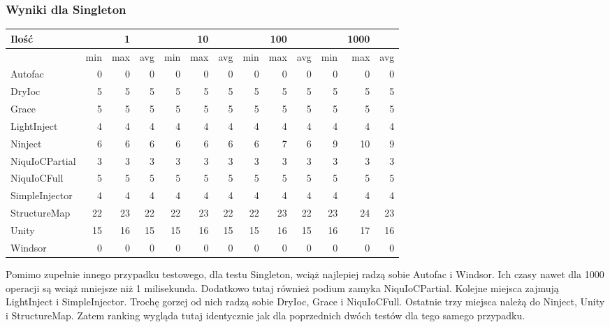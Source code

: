 \documentclass[12pt]{article}
\begin{document}
\subsubsection{Wyniki dla Singleton}
\begin{center}
\begin{small}
	\begin{tabular}{ | l | r r r | r r r | r r r | r r r | }
    		\hline
Ilość & & 1 & & & 10 & & & 100 & & & 1000 & \\ \hline
 & min & max & avg & min & max & avg & min & max & avg & min & max & avg \\ \hline
Autofac & 0 & 0 & 0 & 0 & 0 & 0 & 0 & 0 & 0 & 0 & 0 & 0 \\ \hline
DryIoc & 5 & 5 & 5 & 5 & 5 & 5 & 5 & 5 & 5 & 5 & 5 & 5 \\ \hline
Grace & 5 & 5 & 5 & 5 & 5 & 5 & 5 & 5 & 5 & 5 & 5 & 5 \\ \hline
LightInject & 4 & 4 & 4 & 4 & 4 & 4 & 4 & 4 & 4 & 4 & 4 & 4 \\ \hline
Ninject & 6 & 6 & 6 & 6 & 6 & 6 & 6 & 7 & 6 & 9 & 10 & 9 \\ \hline
NiquIoCPartial & 3 & 3 & 3 & 3 & 3 & 3 & 3 & 3 & 3 & 3 & 3 & 3 \\ \hline
NiquIoCFull & 5 & 5 & 5 & 5 & 5 & 5 & 5 & 5 & 5 & 5 & 5 & 5 \\ \hline
SimpleInjector & 4 & 4 & 4 & 4 & 4 & 4 & 4 & 4 & 4 & 4 & 4 & 4 \\ \hline
StructureMap & 22 & 23 & 22 & 22 & 23 & 22 & 22 & 23 & 22 & 23 & 24 & 23 \\ \hline
Unity & 15 & 16 & 15 & 15 & 16 & 15 & 15 & 16 & 15 & 16 & 17 & 16 \\ \hline
Windsor & 0 & 0 & 0 & 0 & 0 & 0 & 0 & 0 & 0 & 0 & 0 & 0 \\ \hline
  	\end{tabular}
\end{small}
\end{center}
Pomimo zupełnie innego przypadku testowego, dla testu Singleton, wciąż najlepiej radzą sobie Autofac i Windsor. Ich czasy nawet dla 1000 operacji są wciąż mniejsze niż 1 milisekunda. Dodatkowo tutaj również podium zamyka NiquIoCPartial. Kolejne miejsca zajmują LightInject i SimpleInjector. Trochę gorzej od nich radzą sobie DryIoc, Grace i NiquIoCFull. Ostatnie trzy miejsca należą do Ninject, Unity i StructureMap. Zatem ranking wygląda tutaj identycznie jak dla poprzednich dwóch testów dla tego samego przypadku.
\end{document}
